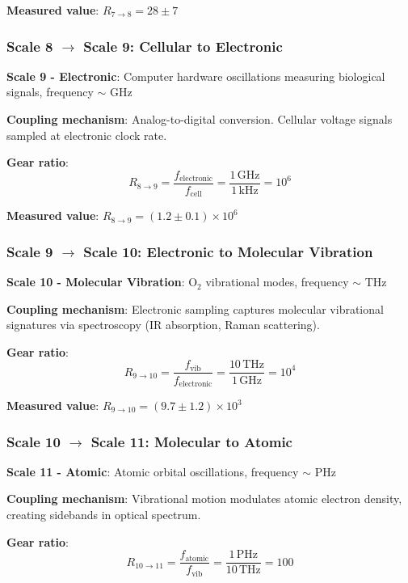 \documentclass[11pt,onecolumn]{article}
\begin{document}
\textbf{Measured value}: $R_{7 \to 8} = 28 \pm 7$

\subsubsection{Scale 8 $\to$ Scale 9: Cellular to Electronic}

\textbf{Scale 9 - Electronic}: Computer hardware oscillations measuring biological signals, frequency $\sim$ GHz

\textbf{Coupling mechanism}: Analog-to-digital conversion. Cellular voltage signals sampled at electronic clock rate.

\textbf{Gear ratio}:
\begin{equation}
R_{8 \to 9} = \frac{f_{\text{electronic}}}{f_{\text{cell}}} = \frac{1\,\text{GHz}}{1\,\text{kHz}} = 10^6
\end{equation}

\textbf{Measured value}: $R_{8 \to 9} = (1.2 \pm 0.1) \times 10^6$

\subsubsection{Scale 9 $\to$ Scale 10: Electronic to Molecular Vibration}

\textbf{Scale 10 - Molecular Vibration}: O$_2$ vibrational modes, frequency $\sim$ THz

\textbf{Coupling mechanism}: Electronic sampling captures molecular vibrational signatures via spectroscopy (IR absorption, Raman scattering).

\textbf{Gear ratio}:
\begin{equation}
R_{9 \to 10} = \frac{f_{\text{vib}}}{f_{\text{electronic}}} = \frac{10\,\text{THz}}{1\,\text{GHz}} = 10^4
\end{equation}

\textbf{Measured value}: $R_{9 \to 10} = (9.7 \pm 1.2) \times 10^3$

\subsubsection{Scale 10 $\to$ Scale 11: Molecular to Atomic}

\textbf{Scale 11 - Atomic}: Atomic orbital oscillations, frequency $\sim$ PHz

\textbf{Coupling mechanism}: Vibrational motion modulates atomic electron density, creating sidebands in optical spectrum.

\textbf{Gear ratio}:
\begin{equation}
R_{10 \to 11} = \frac{f_{\text{atomic}}}{f_{\text{vib}}} = \frac{1\,\text{PHz}}{10\,\text{THz}} = 100
\end{equation}
\end{document}
